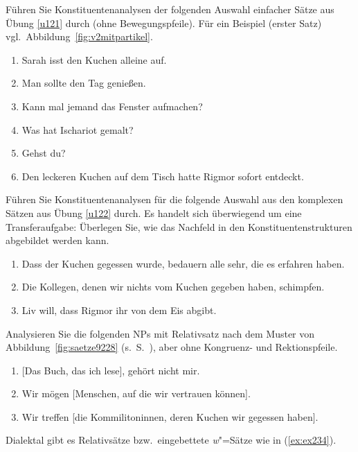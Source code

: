 \Uebung \label{u123} Führen Sie Konstituentenanalysen der folgenden Auswahl einfacher Sätze aus Übung \ref{u121} durch (ohne Bewegungspfeile).
Für ein Beispiel (erster Satz) vgl.\ Abbildung~\ref{fig:v2mitpartikel}.

\begin{enumerate}\Lf
  \item{Sarah isst den Kuchen alleine auf.}
  \item{Man sollte den Tag genießen.}
  \item{Kann mal jemand das Fenster aufmachen?}
  \item{Was hat Ischariot gemalt?}
  \item{Gehst du?}
  \item{Den leckeren Kuchen auf dem Tisch hatte Rigmor sofort entdeckt.}
\end{enumerate}

\Uebung[\tristar] \label{u124} Führen Sie Konstituentenanalysen für die folgende Auswahl aus den komplexen Sätzen aus Übung \ref{u122} durch.
Es handelt sich überwiegend um eine Transferaufgabe:
Überlegen Sie, wie das Nachfeld in den Konstituentenstrukturen abgebildet werden kann.

\begin{enumerate}\Lf
  \item Dass der Kuchen gegessen wurde, bedauern alle sehr, die es erfahren haben.
  \item Die Kollegen, denen wir nichts vom Kuchen gegeben haben, schimpfen.
  \item Liv will, dass Rigmor ihr von dem Eis abgibt.
\end{enumerate}

\Uebung[\tristar] \label{u125} Analysieren Sie die folgenden NPs mit Relativsatz nach dem Muster von Abbildung~\ref{fig:saetze9228} (s.\ S.~\pageref{fig:saetze9228}), aber ohne Kongruenz- und Rektionspfeile.

\begin{enumerate}\Lf
  \item{[Das Buch, das ich lese], gehört nicht mir.}
  \item Wir mögen [Menschen, auf die wir vertrauen können].
  \item Wir treffen [die Kommilitoninnen, deren Kuchen wir gegessen haben].
\end{enumerate}

\newpage

\Uebung[\tristar] \label{u126} Dialektal gibt es Relativsätze bzw.\ eingebettete \textit{w}"=Sätze wie in (\ref{ex:ex234}).

